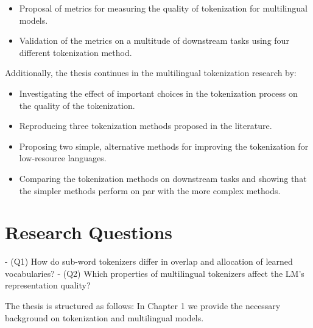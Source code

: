 \begin{itemize}
    \item Proposal of metrics for measuring the quality of tokenization for multilingual models.
    \item Validation of the metrics on a multitude of downstream tasks using four different tokenization method.
\end{itemize}

Additionally, the thesis continues in the multilingual tokenization research by:

\begin{itemize}
    \item Investigating the effect of important choices in the tokenization process on the quality of the tokenization.
    \item Reproducing three tokenization methods proposed in the literature.
    \item Proposing two simple, alternative methods for improving the tokenization for low-resource languages.
    \item Comparing the tokenization methods on downstream tasks and showing that the simpler methods perform on par with the more complex methods.
\end{itemize}

\section{Research Questions}

- (Q1) How do sub-word tokenizers differ in overlap and allocation of learned vocabularies?
- (Q2) Which properties of multilingual tokenizers affect the LM’s representation quality?



The thesis is structured as follows: In Chapter 1 we provide the necessary background on tokenization and multilingual models.  



